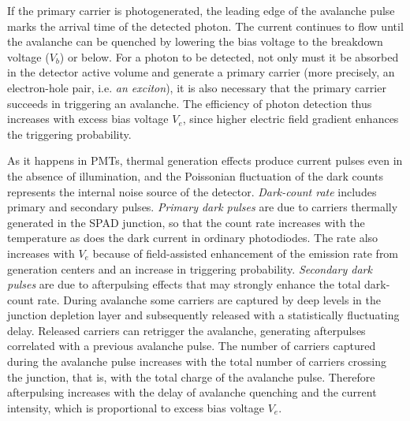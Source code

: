 If the primary carrier is photogenerated, the leading edge of the avalanche pulse marks the arrival time of the detected photon. The current continues to flow until the avalanche can be quenched by lowering the bias voltage to the breakdown voltage ($V_b$) or below. For a photon to be detected, not only must it be absorbed in the detector active volume and generate a primary carrier (more precisely, an electron-hole pair, i.e. \textit{an exciton}), it is also necessary that the primary carrier succeeds in triggering an avalanche. The efficiency of photon detection thus increases with excess bias voltage $V_e$, since higher electric field gradient enhances the triggering probability.   

As it happens in \ac{PMT}s, thermal generation effects produce current pulses even in the absence of illumination, and the Poissonian fluctuation of the dark counts represents the internal noise source of the detector. \textit{Dark-count rate} includes primary and secondary pulses. \textit{Primary dark pulses} are due to carriers thermally generated in the \acs{SPAD} junction, so that the count rate increases with the temperature as does the dark current in ordinary photodiodes. The rate also increases with $V_e$ because of field-assisted enhancement of the emission rate from generation centers and an increase in triggering probability. \textit{Secondary dark pulses} are due to afterpulsing effects that may strongly enhance the total dark-count rate. During avalanche some carriers are captured by deep levels in the junction depletion layer and subsequently released with a statistically fluctuating delay. Released carriers can retrigger the avalanche, generating afterpulses correlated with a previous avalanche pulse. The number of carriers captured during the avalanche pulse increases with the total number of carriers crossing the junction, that is, with the total charge of the avalanche pulse. Therefore afterpulsing increases with the delay of avalanche quenching and the current intensity, which is proportional to excess bias voltage $V_e$.

